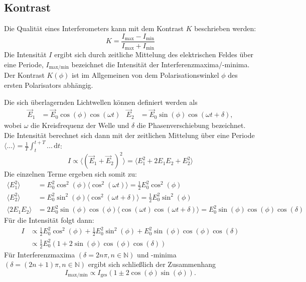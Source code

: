 \subsection{Kontrast}

\noindent Die Qualität eines Interferometers kann mit dem Kontrast $K$ beschrieben werden:
\begin{equation}
        K = \frac{I_{\text{max}} - I_{\text{min}}}{I_{\text{max}} + I_{\text{min}}}
        \label{eqn:kontrast}
\end{equation}
Die Intensität $I$ ergibt sich durch zeitliche Mittelung des elektrischen Feldes über eine Periode, $I_{\text{max/min}}$  bezeichnet die Intensität der Interferenzmaxima/-minima.
Der Kontrast $K(\phi)$ ist im Allgemeinen von dem Polarisationswinkel $\phi$ des ersten Polarisators abhängig. 

\noindent Die sich überlagernden Lichtwellen können definiert werden als 
\begin{align*}
    \vec{E}_1 &= \vec{E}_0 \cos(\phi)\cos(\omega t) & \vec{E}_2 &= \vec{E}_0 \sin(\phi)\cos(\omega t + \delta),
\end{align*} 
wobei $\omega$ die Kreisfrequenz der Welle und $\delta$ die Phasenverschiebung bezeichnet. Die Intensität berechnet sich dann mit der zeitlichen Mittelung über eine Periode 
$\langle ... \rangle = \frac{1}{T} \int_t^{t+T} ... \, \text{d}t$:
\begin{equation*}
    I  \propto \langle \left( \vec{E}_1 + \vec{E}_2 \right)^2 \rangle = \langle E_1^2 + 2 E_1 E_2 + E_2^2 \rangle
\end{equation*} 
Die einzelnen Terme ergeben sich somit zu:
\begin{align*}
    \langle E_1^2 \rangle &= E_0^2 \cos^2(\phi) \langle \cos^2(\omega t) \rangle = \frac{1}{2} E_0^2 \cos^2(\phi) \\
    \langle E_2^2 \rangle &= E_0^2 \sin^2(\phi) \langle \cos^2(\omega t + \delta) \rangle = \frac{1}{2} E_0^2 \sin^2(\phi) \\
    \langle 2 E_1 E_2 \rangle &= 2 E_0^2 \sin(\phi)\cos(\phi) \langle \cos(\omega t) \cos(\omega t + \delta) \rangle = E_0^2 \sin(\phi) \cos(\phi) \cos(\delta) 
\end{align*}
Für die Intensität folgt dann:
\begin{align*}
    I &\propto  \frac{1}{2} E_0^2 \cos^2(\phi) + \frac{1}{2} E_0^2 \sin^2(\phi) + E_0^2 \sin(\phi) \cos(\phi) \cos(\delta)\\
    & \propto \frac{1}{2} E_0^2 \left( 1 + 2 \sin(\phi) \cos(\phi) \cos(\delta) \right)
\end{align*}
Für Interferenzmaxima $\left( \delta = 2n\pi, n \in \mathbb{N} \right)$ und -minima $\left(\delta = (2n+1)\pi, n \in \mathbb{N} \right)$ ergibt sich schließlich der Zusammenhang 
\begin{equation*}
    I_{\text{max/min}} \propto I_{\text{ges}} \left( 1 \pm 2 \cos(\phi)\sin(\phi)\right) . 
\end{equation*}

